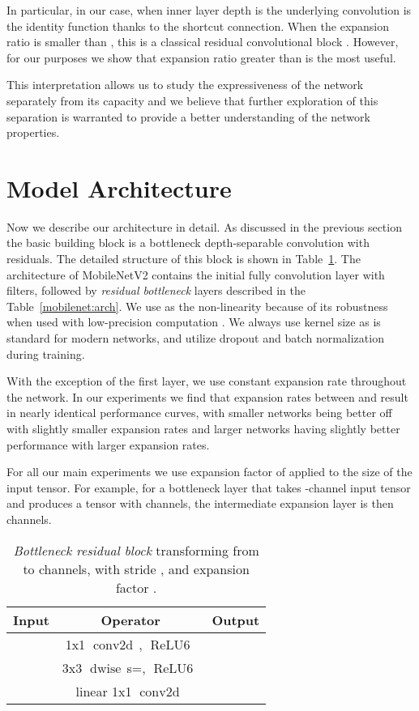 \documentclass[10pt,twocolumn,letterpaper]{article}
\def\relus{{\ensuremath{\operatorname{\mathop{ReLU6}\,}}}}
\def\conv{{\ensuremath{\operatorname{\mathop{conv2d}\,}}}}
\def\depthwise{{\ensuremath{\operatorname{\mathop{dwise}\,}}}}
\begin{document}
In particular, in our case, when inner layer depth is  the underlying convolution is the identity function thanks to the shortcut connection.
When the expansion ratio is smaller than , this is a classical residual convolutional block \cite{ResNet,ResNext2016}.
However, for our purposes we show that expansion ratio greater than  is the most useful.

This interpretation allows us to study the expressiveness of the network separately from its capacity and we believe that further exploration of this separation is warranted to provide a better understanding of the network properties.


\section{Model Architecture}

Now we describe our architecture in detail. As discussed in the previous section the
basic building block is a bottleneck depth-separable convolution with residuals.
The detailed structure
of this block is shown in Table~\ref{fig:bottlenec_block_table}. The architecture of \mbox{MobileNetV2} contains the initial fully convolution layer with  filters, followed by  {\em residual bottleneck} layers described in the Table~\ref{mobilenet:arch}. We use  as the non-linearity because of its robustness when used with low-precision computation \cite{MobilenetV1}. We always use kernel size  as is standard for modern networks, and utilize dropout and batch normalization during training. 

With the exception of the first layer, we use constant expansion rate throughout the network. In our experiments we find that expansion rates between  and  result in nearly identical performance curves, with smaller networks being better off with slightly smaller expansion rates and larger networks having slightly better performance with larger expansion rates.

For all our main experiments we use expansion factor of  applied to the size of the input tensor. For example, for a bottleneck layer that takes -channel input tensor and produces a tensor with  channels, the intermediate expansion layer is then  channels.

\begin{table}
\centering
    \begin{tabular}{c|c|c}
    Input & Operator & Output\\
    \toprule [0.2em]
     & 1x1 \conv, \relus & \\
    & 3x3 \depthwise s=, \relus & \\ 
     & linear 1x1 \conv & \\
    \toprule[0.2em]
    \end{tabular}

    \caption{{\em Bottleneck residual block} transforming from  to  channels, with stride , and expansion factor .}

\label{fig:bottlenec_block_table}
\end{table}
\end{document}
